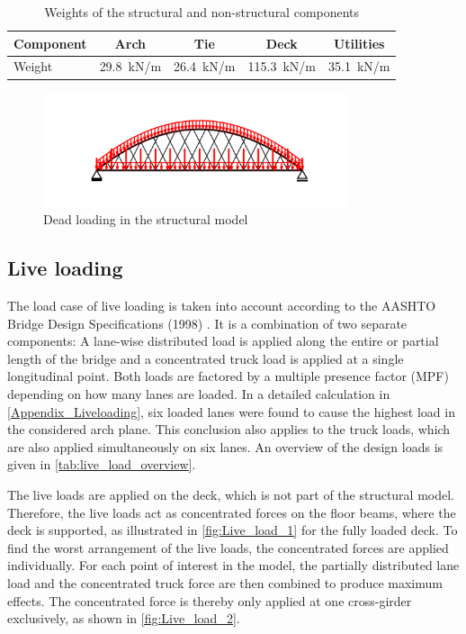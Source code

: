 \begin{table}[H]
    \centering
    \caption{Weights of the structural and non-structural components}
    \label{tab:dead_loads}
    \begin{tabular}{lcccc}
        \toprule
        Component & Arch & Tie & Deck & Utilities \\ \midrule
        Weight & \SI{29.8}{kN/m} & \SI{26.4}{kN/m} & \SI{115.3}{kN/m} & \SI{35.1}{kN/m} \\ \bottomrule
    \end{tabular}
\end{table}

\begin{figure}[H]
    \centering
    \includegraphics[trim={0 0.8cm 0 0.8cm},clip,
    width=0.8\textwidth]{illustrations/figures/permanent loads.png}
    \caption{Dead loading in the structural model}
    \label{fig:dead_loads}
\end{figure}

\subsection{Live loading} \label{sec:met_loads_live}
The load case of live loading is taken into account according to the AASHTO Bridge Design Specifications (1998) \cite{AASHTO}. It is a combination of two separate components: A lane-wise distributed load is applied along the entire or partial length of the bridge and a concentrated truck load is applied at a single longitudinal point. Both loads are factored by a multiple presence factor (MPF) depending on how many lanes are loaded. In a detailed calculation in \cref{Appendix_Liveloading}, six loaded lanes were found to cause the highest load in the considered arch plane. This conclusion also applies to the truck loads, which are also applied simultaneously on six lanes. An overview of the design loads is given in \cref{tab:live_load_overview}. 



The live loads are applied on the deck, which is not part of the structural model. Therefore, the live loads act as concentrated forces on the floor beams, where the deck is supported, as illustrated in \cref{fig:Live_load_1} for the fully loaded deck. To find the worst arrangement of the live loads, the concentrated forces are applied individually. For each point of interest in the model, the partially distributed lane load and the concentrated truck force are then combined to produce maximum effects. The concentrated force is thereby only applied at one cross-girder exclusively, as shown in \cref{fig:Live_load_2}. 


